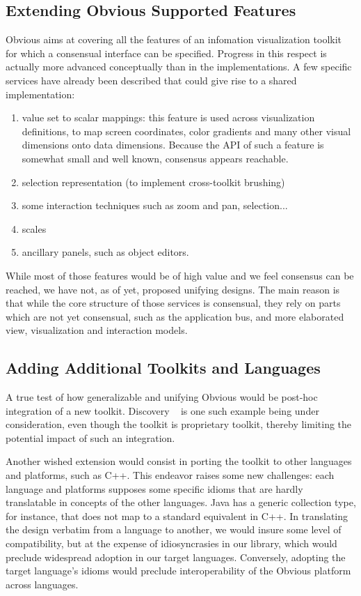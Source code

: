 
\subsection{Extending Obvious Supported Features}

Obvious aims at covering all the features of an infomation
visualization toolkit for which a consensual interface can be
specified.  Progress in this respect is actually more advanced
conceptually than in the implementations.  A few specific services
have already been described that could give rise to a shared
implementation:

\begin{enumerate}
\item value set to scalar mappings: this feature is used across
  visualization definitions, to map screen coordinates, color
  gradients and many other visual dimensions onto data
  dimensions. Because the API of such a feature is somewhat small and
  well known, consensus appears reachable.
\item selection representation (to implement cross-toolkit brushing)
\item some interaction techniques such as zoom and pan, selection...
\item scales
\item ancillary panels, such as object editors.
\end{enumerate}

While most of those features would be of high value and we feel consensus can be reached, we have not, as of yet, proposed unifying designs. The main reason is that while the core structure of those services is consensual, they rely on parts which are not yet consensual, such as the application bus, and more elaborated view, visualization and interaction models.

\subsection{Adding Additional Toolkits and Languages}

A true test of how generalizable and unifying Obvious would be
post-hoc integration of a new toolkit. Discovery ~\cite{Discovery2} is
one such example being under consideration, even though the toolkit is
proprietary toolkit, thereby limiting the potential impact of such an
integration.

Another wished extension would consist in porting the toolkit to other
languages and platforms, such as C++. This endeavor raises some new
challenges: each language and platforms supposes some specific idioms
that are hardly translatable in concepts of the other languages. Java
has a generic collection type, for instance, that does not map to a
standard equivalent in C++. In translating the design verbatim from a
language to another, we would insure some level of compatibility, but
at the expense of idiosyncrasies in our library, which would preclude
widespread adoption in our target languages. Conversely, adopting the
target language's idioms would preclude interoperability of the
Obvious platform across languages.


